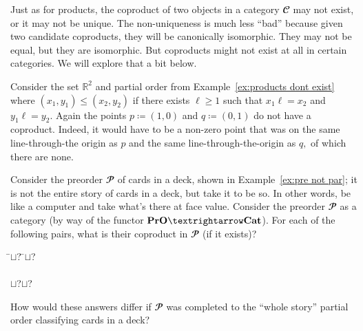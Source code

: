 \documentclass[../main/CT4S-EN-RU]{subfiles}
\begin{document}
\begin{exampleRUS}
\end{exampleRUS}

\begin{blockENG}
Just as for products, the coproduct of two objects in a category ${𝓒}$ may not exist, or it may not be unique. The non-uniqueness is much less “bad” because given two candidate coproducts, they will be canonically isomorphic. They may not be equal, but they are isomorphic. But coproducts might not exist at all in certain categories. We will explore that a bit below.
\end{blockENG}

\begin{blockRUS}
\end{blockRUS}

\begin{exampleENG}
Consider the set ${ℝ}^2$ and partial order from Example~\ref{ex:products dont exist} where $(x_1,y_1)\leq (x_2,y_2)$ if there exists $\ell\geq 1$ such that $x_1\ell=x_2$ and $y_1\ell=y_2.$ Again the points $p{\coloneqq}(1,0)$ and $q{\coloneqq}(0,1)$ do not have a coproduct. Indeed, it would have to be a non-zero point that was on the same line-through-the origin as $p$ and the same line-through-the-origin as $q,$ of which there are none.
\end{exampleENG}

\begin{exampleRUS}
\end{exampleRUS}

\begin{exerciseENG}
Consider the preorder ${𝓟}$ of cards in a deck, shown in Example~\ref{ex:pre not par}; it is not the entire story of cards in a deck, but take it to be so. In other words, be like a computer and take what's there at face value. Consider the preorder ${𝓟}$ as a category (by way of the functor $\PrO{→}\Cat$). For each of the following pairs, what is their coproduct in ${𝓟}$ (if it exists)?
\sexc 
\begin{tabbing}
\hspace{.5in}\= $\sqcup$\;?\hspace{.5in} \=$\sqcup$\;?\\\\
\> $\sqcup$\;?\>$\sqcup$\;?
\end{tabbing}
\item How would these answers differ if ${𝓟}$ was completed to the “whole story” partial order classifying cards in a deck?
\endsexc
\end{exerciseENG}
\end{document}
